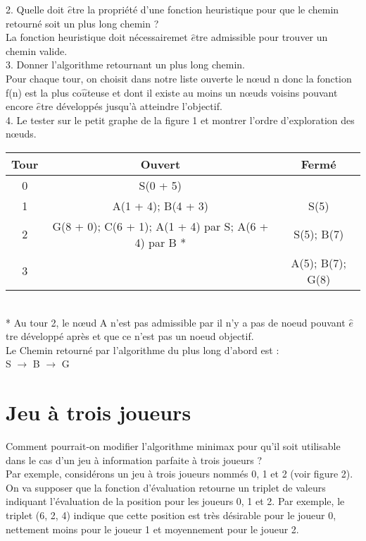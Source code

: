 \documentclass[12pt,a4paper, france]{article}
\newcommand\tab[1][1cm]{\hspace*{#1}}
\begin{document}
\tab 2. Quelle doit ${\hat{e}}$tre la propri\'et\'e d\textquoteright une fonction heuristique pour que le chemin retourn\'e soit un plus long chemin ? \\

La fonction heuristique doit n\'ecessairemet  ${\hat{e}}$tre admissible pour trouver un chemin valide. \\

\tab 3. Donner l\textquoteright algorithme retournant un plus long chemin. \\

Pour chaque tour, on choisit dans notre liste ouverte le nœud n donc la fonction f(n) est la plus co${\hat{u}}$teuse et dont il existe au moins un nœuds voisins pouvant encore ${\hat{e}}$tre d\'evelopp\'es jusqu\textquoteright \`a atteindre l\textquoteright objectif. \\

\tab 4. Le tester sur le petit graphe de la figure 1 et montrer l\textquoteright ordre d\textquoteright exploration des nœuds. \\

\begin{tabular}{ | c || *{2}{c|}}
    \hline
    Tour & Ouvert & Ferm\'e  \\
    \hline
    \hline
    0 & S(0 + 5) & \\
    \hline
    1 & A(1 + 4); B(4 + 3) & S(5)\\
    \hline
    2 & G(8 + 0); C(6 + 1); A(1 + 4) par S; A(6 + 4) par B *& S(5); B(7)\\
    \hline
    3 & & A(5); B(7); G(8) \\
    \hline
\end{tabular} \\
* Au tour 2, le nœud A n\textquoteright est pas admissible par il n\textquoteright y a pas de noeud pouvant ${\hat{e}}$tre d\'evelopp\'e apr\`es et que ce n\textquoteright est pas un noeud objectif.\\

Le Chemin retourn\'e par l\textquoteright algorithme du plus long d\textquoteright abord est : \\
\tab \tab \tab S ${\rightarrow}$ B ${\rightarrow}$ G\\


\section{Jeu \`a trois joueurs}

Comment pourrait-on modifier l\textquoteright algorithme minimax pour qu\textquoteright il soit utilisable dans le cas d\textquoteright un jeu \`a information parfaite \`a trois joueurs ? \\
Par exemple, consid\'erons un jeu \`a trois joueurs nomm\'es 0, 1 et 2 (voir figure 2). On va supposer que la fonction d\textquoteright \'evaluation retourne un triplet de valeurs indiquant l\textquoteright \'evaluation de la position pour les joueurs 0, 1 et 2. Par exemple, le triplet (6, 2, 4) indique que cette position est tr\`es d\'esirable pour le joueur 0, nettement moins pour le joueur 1 et moyennement pour le joueur 2.\\
\end{document}
